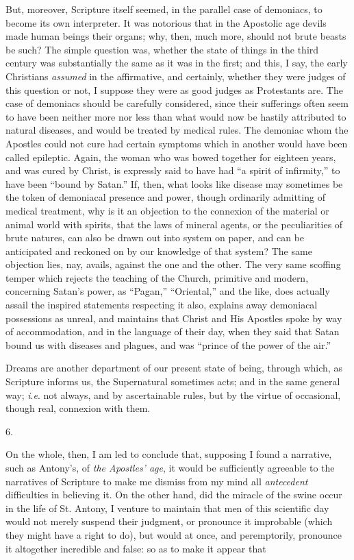But, moreover, Scripture itself seemed, in the parallel case of
demoniacs, to become its own interpreter. It was notorious that in the
Apostolic age devils made human beings their organs; why, then, much
more, should not brute beasts be such? The simple question was,
whether the state of things in the third century was substantially the
same as it was in the first; and this, I say, the early Christians \emph{assumed}
in the affirmative, and certainly, whether they were judges of this
question or not, I suppose they were as good judges as Protestants
are. The case of demoniacs should be carefully considered, since their
sufferings often seem to have been neither more nor less than what
would now be hastily attributed to natural diseases, and would be
treated by medical rules. The demoniac whom the Apostles could not
cure had certain symptoms which in another would have been called
epileptic. Again, the woman who was bowed together for eighteen years,
and was cured by Christ, is expressly said to have had ``a
spirit of infirmity,'' to have been ``bound by Satan.''
If, then, what looks like disease may sometimes be the token of
demoniacal presence and power, though ordinarily admitting of medical
treatment, why is it an objection to the connexion of the material or
animal world with spirits, that the laws of mineral agents, or the
peculiarities of brute natures, can also be drawn out into system on
paper, and can be anticipated and reckoned on by our knowledge of that
system? The same objection lies, nay, avails, against the one and the
other. The very same scoffing temper which rejects the teaching of the
Church, primitive and modern, concerning Satan's power, as
``Pagan,'' ``Oriental,'' and the like, does actually
assail the inspired statements respecting it also, explains away
demoniacal possessions as unreal, and maintains that Christ and His
Apostles spoke by way of accommodation, and in the language of their
day, when they said that Satan bound us with diseases and plagues, and
was ``prince of the power of the air.''

Dreams are another department of our present state of being,
through which, as Scripture informs us, the Supernatural sometimes
acts; and in the same general way; \emph{i}.\emph{e}. not always, and
by ascertainable rules, but by the virtue of occasional, though real,
connexion with them.

6.

On the whole, then, I am led to conclude that, supposing I found a
narrative, such as Antony's, of \emph{the Apostles' age}, it would be
sufficiently agreeable to the narratives of Scripture to make me
dismiss from my mind all \emph{antecedent} difficulties in believing
it. On the other hand, did the miracle of the swine occur in the life of St. Antony, I venture to maintain that men of this scientific
day would not merely suspend their judgment, or pronounce it
improbable (which they might have a right to do), but would at once,
and peremptorily, pronounce it altogether incredible and false: so as
to make it appear that

